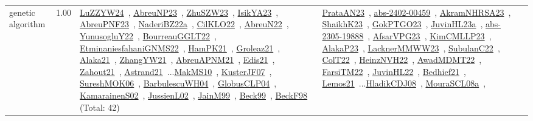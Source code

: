 {\begin{longtable}{p{3cm}r>{\raggedright\arraybackslash}p{6cm}>{\raggedright\arraybackslash}p{6cm}>{\raggedright\arraybackslash}p{8cm}}
\index{genetic algorithm}\index{Algorithms!genetic algorithm}genetic algorithm &  1.00 & \href{../works/LuZZYW24.pdf}{LuZZYW24}~\cite{LuZZYW24}, \href{../works/AbreuNP23.pdf}{AbreuNP23}~\cite{AbreuNP23}, \href{../works/ZhuSZW23.pdf}{ZhuSZW23}~\cite{ZhuSZW23}, \href{../works/IsikYA23.pdf}{IsikYA23}~\cite{IsikYA23}, \href{../works/AbreuPNF23.pdf}{AbreuPNF23}~\cite{AbreuPNF23}, \href{../works/NaderiBZ22a.pdf}{NaderiBZ22a}~\cite{NaderiBZ22a}, \href{../works/CilKLO22.pdf}{CilKLO22}~\cite{CilKLO22}, \href{../works/AbreuN22.pdf}{AbreuN22}~\cite{AbreuN22}, \href{../works/YunusogluY22.pdf}{YunusogluY22}~\cite{YunusogluY22}, \href{../works/BourreauGGLT22.pdf}{BourreauGGLT22}~\cite{BourreauGGLT22}, \href{../works/EtminaniesfahaniGNMS22.pdf}{EtminaniesfahaniGNMS22}~\cite{EtminaniesfahaniGNMS22}, \href{../works/HamPK21.pdf}{HamPK21}~\cite{HamPK21}, \href{../works/Groleaz21.pdf}{Groleaz21}~\cite{Groleaz21}, \href{../works/Alaka21.pdf}{Alaka21}~\cite{Alaka21}, \href{../works/ZhangYW21.pdf}{ZhangYW21}~\cite{ZhangYW21}, \href{../works/AbreuAPNM21.pdf}{AbreuAPNM21}~\cite{AbreuAPNM21}, \href{../works/Edis21.pdf}{Edis21}~\cite{Edis21}, \href{../works/Zahout21.pdf}{Zahout21}~\cite{Zahout21}, \href{../works/Astrand21.pdf}{Astrand21}~\cite{Astrand21}...\href{../works/MakMS10.pdf}{MakMS10}~\cite{MakMS10}, \href{../works/KusterJF07.pdf}{KusterJF07}~\cite{KusterJF07}, \href{../works/SureshMOK06.pdf}{SureshMOK06}~\cite{SureshMOK06}, \href{../works/BarbulescuWH04.pdf}{BarbulescuWH04}~\cite{BarbulescuWH04}, \href{../works/GlobusCLP04.pdf}{GlobusCLP04}~\cite{GlobusCLP04}, \href{../works/KamarainenS02.pdf}{KamarainenS02}~\cite{KamarainenS02}, \href{../works/JussienL02.pdf}{JussienL02}~\cite{JussienL02}, \href{../works/JainM99.pdf}{JainM99}~\cite{JainM99}, \href{../works/Beck99.pdf}{Beck99}~\cite{Beck99}, \href{../works/BeckF98.pdf}{BeckF98}~\cite{BeckF98} (Total: 42) & \href{../works/PrataAN23.pdf}{PrataAN23}~\cite{PrataAN23}, \href{../works/abs-2402-00459.pdf}{abs-2402-00459}~\cite{abs-2402-00459}, \href{../works/AkramNHRSA23.pdf}{AkramNHRSA23}~\cite{AkramNHRSA23}, \href{../works/ShaikhK23.pdf}{ShaikhK23}~\cite{ShaikhK23}, \href{../works/GokPTGO23.pdf}{GokPTGO23}~\cite{GokPTGO23}, \href{../works/JuvinHL23a.pdf}{JuvinHL23a}~\cite{JuvinHL23a}, \href{../works/abs-2305-19888.pdf}{abs-2305-19888}~\cite{abs-2305-19888}, \href{../works/AfsarVPG23.pdf}{AfsarVPG23}~\cite{AfsarVPG23}, \href{../works/KimCMLLP23.pdf}{KimCMLLP23}~\cite{KimCMLLP23}, \href{../works/AlakaP23.pdf}{AlakaP23}~\cite{AlakaP23}, \href{../works/LacknerMMWW23.pdf}{LacknerMMWW23}~\cite{LacknerMMWW23}, \href{../works/SubulanC22.pdf}{SubulanC22}~\cite{SubulanC22}, \href{../works/ColT22.pdf}{ColT22}~\cite{ColT22}, \href{../works/HeinzNVH22.pdf}{HeinzNVH22}~\cite{HeinzNVH22}, \href{../works/AwadMDMT22.pdf}{AwadMDMT22}~\cite{AwadMDMT22}, \href{../works/FarsiTM22.pdf}{FarsiTM22}~\cite{FarsiTM22}, \href{../works/JuvinHL22.pdf}{JuvinHL22}~\cite{JuvinHL22}, \href{../works/Bedhief21.pdf}{Bedhief21}~\cite{Bedhief21}, \href{../works/Lemos21.pdf}{Lemos21}~\cite{Lemos21}...\href{../works/HladikCDJ08.pdf}{HladikCDJ08}~\cite{HladikCDJ08}, \href{../works/MouraSCL08a.pdf}{MouraSCL08a}~\cite{MouraSCL08a}, 
\end{longtable}}
